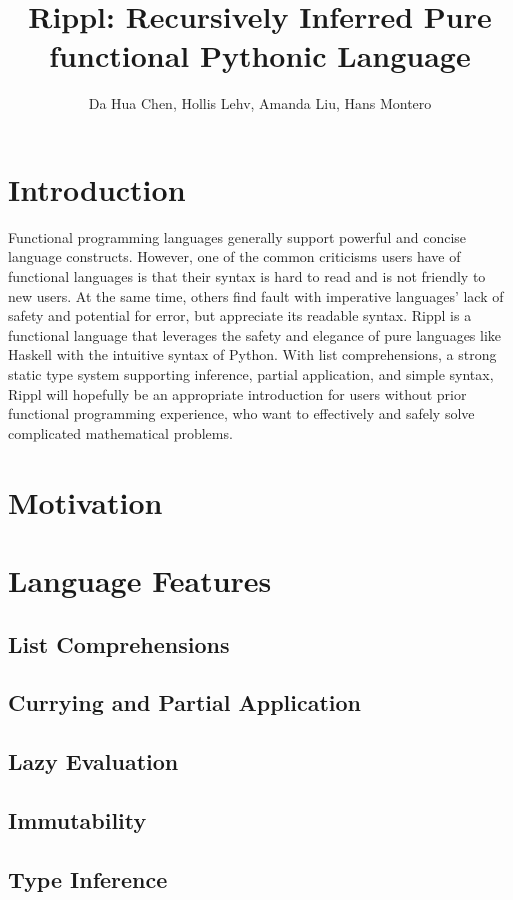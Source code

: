 \documentclass[5pt]{article}
\title{Rippl: Recursively Inferred Pure functional Pythonic Language}
\author{Da Hua Chen, Hollis Lehv, Amanda Liu, Hans Montero}
\date{}
\begin{document}
\maketitle

\section{Introduction}
Functional programming languages generally support powerful and concise language constructs. However, one of the common criticisms users have of functional languages is that their syntax is hard to read and is not friendly to new users. At the same time, others find fault with imperative languages’ lack of safety and potential for error, but appreciate its readable syntax. Rippl is a functional language that leverages the safety and elegance of pure languages like Haskell with the intuitive syntax of Python. With list comprehensions, a strong static type system supporting inference, partial application, and simple syntax, Rippl will hopefully be an appropriate introduction for users without prior functional programming experience, who want to effectively and safely solve complicated mathematical problems.


\section{Motivation}

\pagebreak

\section{Language Features}
\subsection{List Comprehensions}
\subsection{Currying and Partial Application}
\subsection{Lazy Evaluation}
\subsection{Immutability}
\subsection{Type Inference}
\pagebreak
\end{document}
